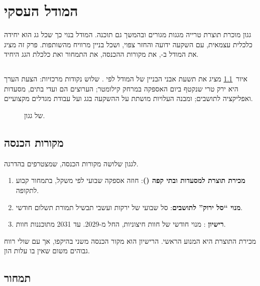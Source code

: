 \chapter{המודל העסקי}\label{ch:business-model}

גגון מוכרת תוצרת טרייה מגגות מגורים ובהמשך גם תוכנה. המודל בנוי כך שכל גג הוא יחידה כלכלית עצמאית, עם השקעה ידועה והחזר צפוי, ושכל בניין מרוויח מהשותפות. פרק זה מציג את המודל ב-, את מקורות ההכנסה, את התמחור ואת כלכלת הגג היחיד.

\section{}\label{sec:bmc}

איור~\ref{fig:bmc} מציג את תשעת אבני הבניין של המודל לפי \cite{osterwalder2010}. שלוש נקודות מרכזיות: הצעת הערך היא ירק טרי שנקטף ביום האספקה במרחק קילומטר; הערוצים הם ועדי בתים, מסעדות ואפליקציה לתושבים; ומבנה העלויות מושתת על ההשקעה בגג ועל עבודת מגדלים מקצועיים.

\begin{figure}[htbp]
  \centering
  \resizebox{\linewidth}{!}{}
  \caption{ של גגון.}
  \label{fig:bmc}
\end{figure}

\section{מקורות הכנסה}\label{sec:revenue-streams}

לגגון שלושה מקורות הכנסה, שמצטרפים בהדרגה.

\begin{enumerate}
  \item \textbf{מכירת תוצרת למסעדות ובתי קפה ()}: חוזה אספקה שבועי לפי משקל, בתמחור קבוע לתקופה.
  \item \textbf{מנוי \enquote{סל ירוק} לתושבים}: סל שבועי של ירקות ועשבי תבשיל תמורת תשלום חודשי.
  \item \textbf{רישיון }: מנוי חודשי של חוות חיצוניות, החל מ-2029. עד 2031 מתוכננות \RRsaasFarmsFinal{} חוות.
\end{enumerate}

מכירת התוצרת היא המנוע הראשי. הרישיון הוא מקור הכנסה משני בהיקפו, אך עם שולי רווח גבוהים משום שאין בו עלות הון.

\section{תמחור}\label{sec:pricing}

